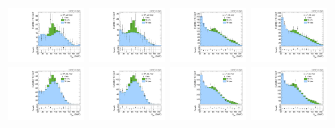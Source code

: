 \begin{figure}[htbp]
  \includegraphics[width=0.18\textwidth]{fig/fitValidation/PostFit_SR_MJJ__mu_HP_vbf_LDy_Run2.pdf}
  \includegraphics[width=0.18\textwidth]{fig/fitValidation/PostFit_SR_MJJ__e_HP_vbf_LDy_Run2.pdf}
  \includegraphics[width=0.18\textwidth]{fig/fitValidation/PostFit_SR_MJJ__mu_LP_vbf_LDy_Run2.pdf}
  \includegraphics[width=0.18\textwidth]{fig/fitValidation/PostFit_SR_MJJ__e_LP_vbf_LDy_Run2.pdf}\\
  \includegraphics[width=0.18\textwidth]{fig/fitValidation/PostFit_SR_MJJ__mu_HP_bb_HDy_Run2.pdf}
  \includegraphics[width=0.18\textwidth]{fig/fitValidation/PostFit_SR_MJJ__e_HP_bb_HDy_Run2.pdf}
  \includegraphics[width=0.18\textwidth]{fig/fitValidation/PostFit_SR_MJJ__mu_LP_bb_HDy_Run2.pdf}
  \includegraphics[width=0.18\textwidth]{fig/fitValidation/PostFit_SR_MJJ__e_LP_bb_HDy_Run2.pdf}\\

\end{figure}
